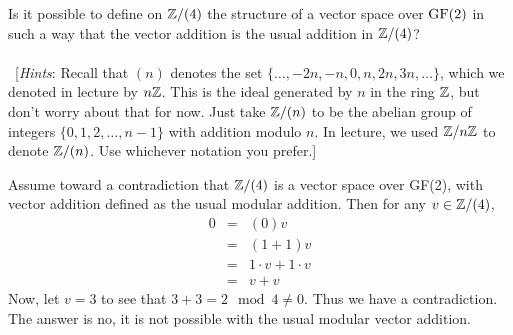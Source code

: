 \begin{problem}[Golan 56]

Is it possible to define on $\mathbb{Z}/(4)$ the structure of a vector space over
$\operatorname{GF}(2)$ in such a way that the vector addition is the usual addition in
$\mathbb{Z}/(4)$?\\
\\
~[{\it Hints}: Recall that $(n)$ denotes the set $\{\dots, -2n, -n, 0, n, 2n,
  3n, \dots\}$, which we denoted in lecture by $n\mathbb{Z}$.  This is the ideal
  generated by $n$ in the ring $\mathbb{Z}$, but don't worry about that for now. Just
  take $\mathbb{Z}/(n)$ to be the abelian group of integers $\{0, 1, 2, \dots, n-1\}$
  with addition modulo $n$.  In lecture, we used $\mathbb{Z}/n\mathbb{Z}$ to denote
  $\mathbb{Z}/(n)$. Use whichever notation you prefer.]

\end{problem}
\smallskip
\begin{solution}
Assume toward a contradiction that $\mathbb{Z}/(4)$ is a vector space over GF(2), with vector addition defined as the usual modular addition. Then for any $v \in \mathbb{Z}/(4)$,
\begin{eqnarray*}
0 & = & (0)v \\ & = & (1+1)v \\ & = & 1 \cdot v + 1 \cdot v \\ & = & v + v
\end{eqnarray*}
Now, let $v = 3$ to see that $3 + 3 = 2\mod{4} \neq 0$. Thus we have a contradiction. The answer is no, it is not possible with the usual modular vector addition.
\end{solution}
\probskip



\newcommand\R{\fld{R}}

